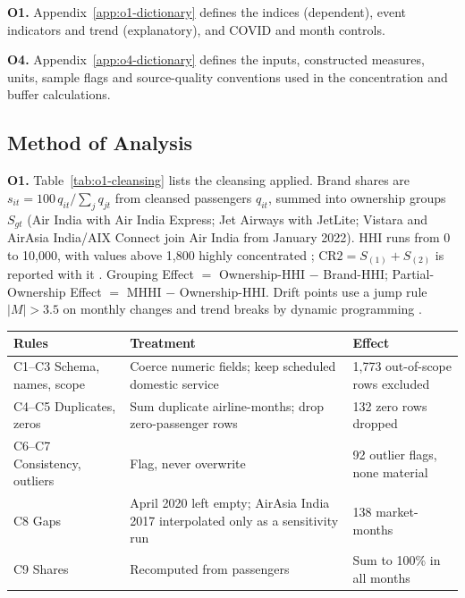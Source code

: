 \documentclass[12pt,a4paper]{article}
\newif\ifoneon
\newcommand{\oneHL}{\par\oneontrue\color{orange}\captionsetup{font+={color=blue}}}
\begin{document}
{\oneHL \textbf{O1.} Appendix~\ref{app:o1-dictionary} defines the indices (dependent), event indicators and trend (explanatory), and COVID and month controls.\par}

\textbf{O4.} Appendix~\ref{app:o4-dictionary} defines the inputs, constructed measures, units, sample flags and source-quality conventions used in the concentration and buffer calculations.

\clearpage
\subsection{Method of Analysis}
{\oneHL \textbf{O1.} Table~\ref{tab:o1-cleansing} lists the cleansing applied. Brand shares are $s_{it}=100\,q_{it}/\sum_j q_{jt}$ from cleansed passengers $q_{it}$, summed into ownership groups $S_{gt}$ (Air India with Air India Express; Jet Airways with JetLite; Vistara and AirAsia India/AIX Connect join Air India from January 2022). HHI runs from 0 to 10,000, with values above 1,800 highly concentrated \parencite{dojftc2023merger}; $\mathrm{CR2}=S_{(1)}+S_{(2)}$ is reported with it \parencite{gandhi2026marketstructure}. Grouping Effect $=$ Ownership-HHI $-$ Brand-HHI; Partial-Ownership Effect $=$ MHHI $-$ Ownership-HHI. Drift points use a jump rule $|M|>3.5$ on monthly changes \parencite{iglewicz1993outliers} and trend breaks by dynamic programming \parencite{baiperron2003}.

\begin{minipage}{\linewidth}
\label{tab:o1-cleansing}
\centering
{\footnotesize{}\setlength{\tabcolsep}{4pt}
\begin{tabular}{@{}p{2.3cm}p{5.2cm}p{6.6cm}@{}}
\toprule
Rules & Treatment & Effect \\
\midrule
C1--C3 Schema, names, scope & Coerce numeric fields; keep scheduled domestic service & 1,773 out-of-scope rows excluded \\
C4--C5 Duplicates, zeros & Sum duplicate airline-months; drop zero-passenger rows & 132 zero rows dropped \\
C6--C7 Consistency, outliers & Flag, never overwrite & 92 outlier flags, none material \\
C8 Gaps & April 2020 left empty; AirAsia India 2017 interpolated only as a sensitivity run & 138 market-months \\
C9 Shares & Recomputed from passengers & Sum to 100\% in all months \\
\bottomrule
\end{tabular}\par}
\end{minipage}

}
\end{document}
